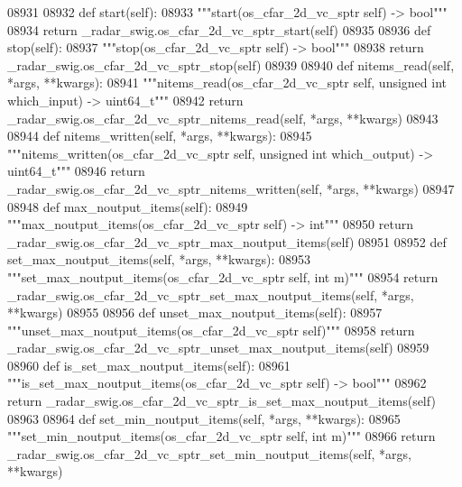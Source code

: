 \begin{DoxyCode}
{{{{{{{{{{{{{{{{{{{{{{{{{{{{{08931 
08932     \textcolor{keyword}{def }start(self):
08933         \textcolor{stringliteral}{"""start(os\_cfar\_2d\_vc\_sptr self) -> bool"""}
08934         \textcolor{keywordflow}{return} \_radar\_swig.os\_cfar\_2d\_vc\_sptr\_start(self)
08935 
08936     \textcolor{keyword}{def }stop(self):
08937         \textcolor{stringliteral}{"""stop(os\_cfar\_2d\_vc\_sptr self) -> bool"""}
08938         \textcolor{keywordflow}{return} \_radar\_swig.os\_cfar\_2d\_vc\_sptr\_stop(self)
08939 
08940     \textcolor{keyword}{def }nitems_read(self, *args, **kwargs):
08941         \textcolor{stringliteral}{"""nitems\_read(os\_cfar\_2d\_vc\_sptr self, unsigned int which\_input) -> uint64\_t"""}
08942         \textcolor{keywordflow}{return} \_radar\_swig.os\_cfar\_2d\_vc\_sptr\_nitems\_read(self, *args, **kwargs)
08943 
08944     \textcolor{keyword}{def }nitems_written(self, *args, **kwargs):
08945         \textcolor{stringliteral}{"""nitems\_written(os\_cfar\_2d\_vc\_sptr self, unsigned int which\_output) -> uint64\_t"""}
08946         \textcolor{keywordflow}{return} \_radar\_swig.os\_cfar\_2d\_vc\_sptr\_nitems\_written(self, *args, **kwargs)
08947 
08948     \textcolor{keyword}{def }max_noutput_items(self):
08949         \textcolor{stringliteral}{"""max\_noutput\_items(os\_cfar\_2d\_vc\_sptr self) -> int"""}
08950         \textcolor{keywordflow}{return} \_radar\_swig.os\_cfar\_2d\_vc\_sptr\_max\_noutput\_items(self)
08951 
08952     \textcolor{keyword}{def }set_max_noutput_items(self, *args, **kwargs):
08953         \textcolor{stringliteral}{"""set\_max\_noutput\_items(os\_cfar\_2d\_vc\_sptr self, int m)"""}
08954         \textcolor{keywordflow}{return} \_radar\_swig.os\_cfar\_2d\_vc\_sptr\_set\_max\_noutput\_items(self, *args, **kwargs)
08955 
08956     \textcolor{keyword}{def }unset_max_noutput_items(self):
08957         \textcolor{stringliteral}{"""unset\_max\_noutput\_items(os\_cfar\_2d\_vc\_sptr self)"""}
08958         \textcolor{keywordflow}{return} \_radar\_swig.os\_cfar\_2d\_vc\_sptr\_unset\_max\_noutput\_items(self)
08959 
08960     \textcolor{keyword}{def }is_set_max_noutput_items(self):
08961         \textcolor{stringliteral}{"""is\_set\_max\_noutput\_items(os\_cfar\_2d\_vc\_sptr self) -> bool"""}
08962         \textcolor{keywordflow}{return} \_radar\_swig.os\_cfar\_2d\_vc\_sptr\_is\_set\_max\_noutput\_items(self)
08963 
08964     \textcolor{keyword}{def }set_min_noutput_items(self, *args, **kwargs):
08965         \textcolor{stringliteral}{"""set\_min\_noutput\_items(os\_cfar\_2d\_vc\_sptr self, int m)"""}
08966         \textcolor{keywordflow}{return} \_radar\_swig.os\_cfar\_2d\_vc\_sptr\_set\_min\_noutput\_items(self, *args, **kwargs)
}}}}}}}}}}}}}}}}}}}}}}}}}}}}}
\end{DoxyCode}
